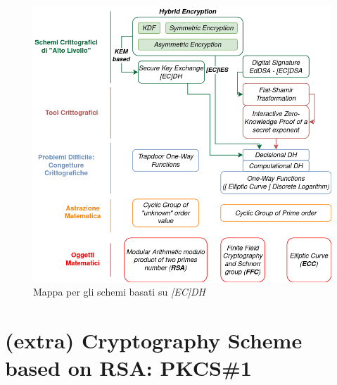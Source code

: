 \begin{figure}[h]
    \centering
    \includegraphics[width=\textwidth]{img/md_crypto_2.png}
    \caption{Mappa per gli schemi basati su \textit{[EC]DH}}
\end{figure}

\newpage

\section{(extra) Cryptography Scheme based on RSA: PKCS\#1}